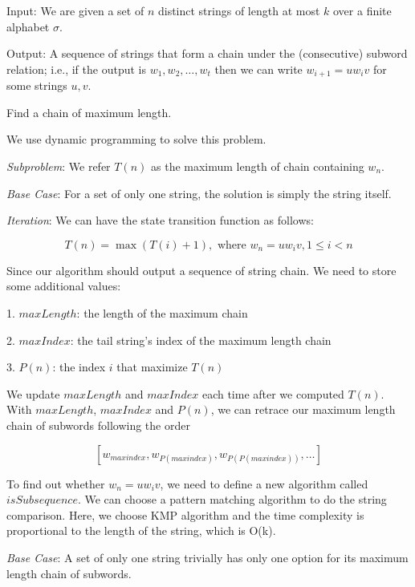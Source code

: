\newpage
{} %

\problemdes

Input: We are given a set of $n$ distinct strings of length at most $k$ over a finite alphabet $\sigma$.

Output: A sequence of strings that form a chain under the (consecutive) subword relation; i.e., if the output is $w_{1}, w_{2}, \dots, w_{t}$ then we can write $w_{i+1}=u w_{i} v$ for some strings $u,v$.

Find a chain of maximum length.

\solution


We use dynamic programming to solve this problem. 

\textit{Subproblem}: We refer $T(n)$ as the maximum length of chain containing $w_n$. 

\textit{Base Case}: For a set of only one string, the solution is simply the string itself.

\textit{Iteration}: We can have the state transition function as follows:

$$T(n) = \max(T(i) + 1), \text{ where }w_{n}=u w_{i} v, 1\leq i <n$$

Since our algorithm should output a sequence of string chain. We need to store some additional values:

1. $maxLength$: the length of the maximum chain

2. $maxIndex$: the tail string's index of the maximum length chain

3. $P(n)$: the index $i$ that maximize $T(n)$

We update $maxLength$ and $maxIndex$ each time after we computed $T(n)$. With $maxLength$, $maxIndex$ and $P(n)$, we can retrace our maximum length chain of subwords following the order

$$[w_{maxindex}, w_{P(maxindex)}, w_{P(P(maxindex))}, \dots]$$

To find out whether $w_{n}=u w_{i} v$, we need to define a new algorithm called $isSubsequence$. We can choose a pattern matching algorithm to do the string comparison. Here, we choose KMP algorithm and the time complexity is proportional to the length of the string, which is O(k).




\textit{Base Case}: A set of only one string trivially has only one option for its maximum length chain of subwords.

